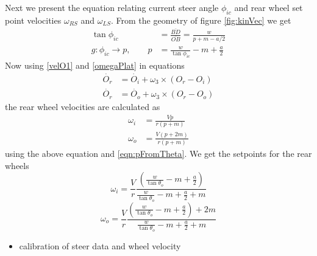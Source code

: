 Next we present  the equation relating current steer angle $\phi_{ic}$   and rear wheel  set point velocities $\omega_{RS}$ and $\omega_{LS}$. From the geometry of figure \ref{fig:kinVec} we get
\begin{align}
\nonumber \tan\phi_{ic} &=\frac{\bar{BD}}{\bar{OB}}=\frac{w}{p+m-a/2}\\ 
g:\phi_{ic} \rightarrow p,\quad \quad p &= \frac{w}{\tan\phi_{ic}}-m + \frac{a}{2}
\label{eqn:pFromTheta}
\end{align}
Now using \ref{velO1} and \ref{omegaPlat} in equations 
\begin{align*}
\dot{O_r}&=\dot{O_i}+\omega_3 \times (O_r-O_i)\\
\dot{O_r}&=\dot{O_o}+\omega_3 \times (O_r-O_o)
\end{align*}
 the rear wheel velocities are calculated as 
\begin{align}
\nonumber \omega_i&=\frac{Vp}{r(p+m)}\\
\nonumber \omega_o &=\frac{V(p+2m)}{r(p+m)}
\end{align}
using the above equation and \ref{eqn:pFromTheta}. We get the setpoints for the rear wheels 
\begin{equation}
\omega_i =\frac{V}{r}\frac{( \frac{w}{\tan\theta_o}-m + \frac{a}{2})}{ \frac{w}{\tan\theta_o}-m + \frac{a}{2}+m}
\end{equation}
\begin{equation}
\omega_o =\frac{V}{r}\frac{( \frac{w}{\tan\theta_o}-m + \frac{a}{2})+2m}{ \frac{w}{\tan\theta_o}-m + \frac{a}{2}+m}
\end{equation}
 

 
\begin{itemize}
\item calibration of steer data and wheel velocity
\end{itemize}

